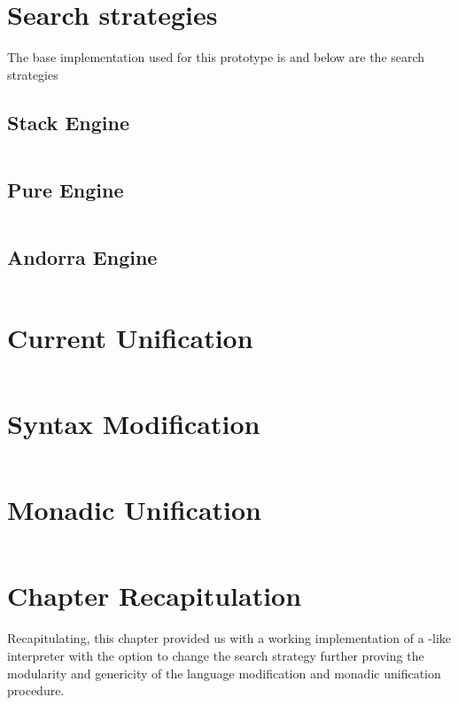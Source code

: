\documentclass[thesis-solanki.tex]{files}
\begin{document}
\section{Search strategies}
The base implementation used for this prototype  is \cite{website:mini-prolog-hugs98} and below are the search
strategies
\subsection{Stack Engine}
\begin{singlespace}
\inputminted[linenos, firstline=29, lastline=62]{haskell}{haskell-proto3-sudsy-woe.hs}
\end{singlespace}

\subsection{Pure Engine}
\begin{singlespace}
\inputminted[linenos, firstline=26, lastline=46]{haskell}{haskell-proto3-absurd-silicon.hs}
\end{singlespace}

\subsection{Andorra Engine}
\begin{singlespace}
\inputminted[linenos, firstline=29, lastline=75]{haskell}{haskell-proto3-diatomic-unbank.hs}
\end{singlespace}

\section{Current Unification}
\begin{singlespace}
  \inputminted[linenos, firstline=65, lastline=82]{haskell}{haskell-proto3-pentyl-skater.hs}
\end{singlespace}


\section{Syntax Modification}
\begin{singlespace}
  \inputminted[linenos, lastline=352]{haskell}{haskell-proto3-uplift-apart.hs}
\end{singlespace}

\section{Monadic Unification}
\begin{singlespace}
  \inputminted[linenos]{haskell}{haskell-proto3-bevy-icebox.hs}
\end{singlespace}


\section{Chapter Recapitulation}
Recapitulating, this chapter provided us with a working implementation of a -like interpreter with the option to change
the search strategy further proving the modularity and genericity of the language modification and monadic unification procedure.
\end{document}
